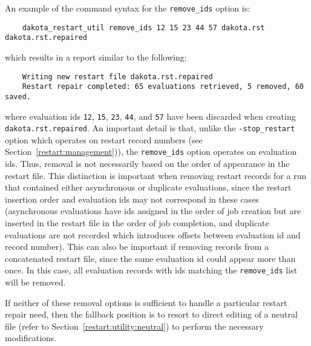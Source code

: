 An example of the command syntax for the \texttt{remove\_ids} option is:
\begin{small}
\begin{verbatim}
    dakota_restart_util remove_ids 12 15 23 44 57 dakota.rst dakota.rst.repaired
\end{verbatim}
\end{small}
which results in a report similar to the following:
\begin{small}
\begin{verbatim}
    Writing new restart file dakota.rst.repaired
    Restart repair completed: 65 evaluations retrieved, 5 removed, 60 saved.
\end{verbatim}
\end{small}
where evaluation ids \texttt{12}, \texttt{15}, \texttt{23},
\texttt{44}, and \texttt{57} have been discarded when creating
\texttt{dakota.rst.repaired}. An important detail is that, unlike the 
\texttt{-stop\_restart} option which operates on restart record numbers 
(see Section~\ref{restart:management})), the \texttt{remove\_ids}
option operates on evaluation ids.  Thus, removal is not necessarily
based on the order of appearance in the restart file. This distinction
is important when removing restart records for a run that contained
either asynchronous or duplicate evaluations, since the restart
insertion order and evaluation ids may not correspond in these cases
(asynchronous evaluations have ids assigned in the order of job
creation but are inserted in the restart file in the order of job
completion, and duplicate evaluations are not recorded which
introduces offsets between evaluation id and record number). This can
also be important if removing records from a concatenated restart
file, since the same evaluation id could appear more than once. In
this case, all evaluation records with ids matching the
\texttt{remove\_ids} list will be removed.

If neither of these removal options is sufficient to handle a
particular restart repair need, then the fallback position is to
resort to direct editing of a neutral file (refer to
Section~\ref{restart:utility:neutral}) to perform the necessary
modifications.

